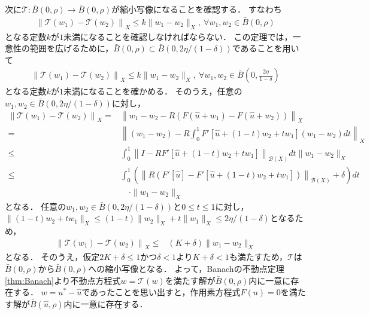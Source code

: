 \begin{Proof}
	次に${\mathcal T}: \bar{B}(0, \rho) \rightarrow \bar{B}(0, \rho)$が縮小写像になることを確認する．
	すなわち
	\begin{align*}
		\left\| {\mathcal T}(w_1) - {\mathcal T}(w_2) \right\|_{X} \le k \| w_1 - w_2 \|_{X}, ~ \forall w_1, w_2 \in \bar{B}(0, \rho)
	\end{align*}
	となる定数$k$が$1$未満になることを確認しなければならない．
	この定理では，一意性の範囲を広げるために，$\bar{B}(0, \rho) \subset \bar{B}(0, 2\eta/(1 - \delta))$であることを用いて
	\begin{align*}
		\left\| {\mathcal T}(w_1) - {\mathcal T}(w_2) \right\|_{X} \le k \| w_1 - w_2 \|_{X}, ~ \forall w_1, w_2 \in \bar{B}\left(0, \frac{2 \eta}{1 - \delta} \right)
	\end{align*}
	となる定数$k$が$1$未満になることを確かめる．
	そのうえ，任意の$w_1, w_2 \in \bar{B}(0, 2 \eta/(1-\delta))$に対し，
	\begin{align*}
	\left\| {\mathcal T}(w_1) - {\mathcal T}(w_2) \right\|_{X} =& \left\| w_1 - w_2 - R \left( F(\hat{u} + w_1) - F(\hat{u} + w_2) \right) \right\|_{X} \\
		=& \left\| (w_1 - w_2) - R  \int_0^1  F'[\hat{u} + (1-t)w_2 + t w_1] (w_1 - w_2)dt \right\|_{X} \\
		\le& \int_0^1 \left\| I - R F'[\hat{u} + (1-t)w_2 + t w_1] \right\|_{{\mathcal B}(X)} dt \| w_1 - w_2 \|_{X} \\
		\le& \int_0^1 \left( \left\| R \left( F'[\hat{u}] -  F'[\hat{u} + (1-t)w_2 + t w_1] \right) \right\|_{{\mathcal B}(X)} + \delta \right) dt \\
		&\quad \cdot \| w_1 - w_2 \|_{X}
	\end{align*}
	となる．
	任意の$w_1, w_2 \in \bar{B}(0, 2\eta/(1 - \delta) )$と$0 \le t \le 1$に対し，$\| (1-t)w_2 + t w_1 \|_{X} \le (1-t) \| w_2 \|_{X} + t \| w_1 \|_{X} \le 2\eta/(1-\delta)$となるため，
	\begin{align*}
	\left\| {\mathcal T}(w_1) - {\mathcal T}(w_2) \right\|_{X} \le& \left( K + \delta \right) \| w_1 - w_2 \|_{X}
	\end{align*}
	となる．
	そのうえ，仮定$2K + \delta \le 1$かつ$\delta < 1$より$K + \delta < 1$も満たすため，${\mathcal T}$は$\bar{B}(0, \rho)$から$\bar{B}(0, \rho)$への縮小写像となる．
	よって，Banachの不動点定理\ref{thm:Banach}より不動点方程式$w = {\mathcal T}(w)$を満たす解が$\bar{B}(0, \rho)$内に一意に存在する．
	$w = u^* - \hat{u}$であったことを思い出すと，作用素方程式$F(u) = 0$を満たす解が$\bar{B}(\hat{u}, \rho)$内に一意に存在する．



\end{Proof}
